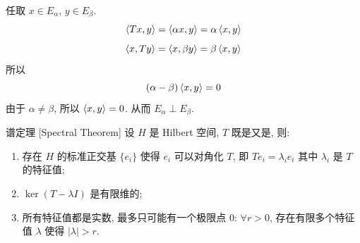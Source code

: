         \begin{prf}
            任取 \(x\in E_\alpha\), \(y\in E_\beta\).
            \[\expval{Tx, y}=\expval{\alpha x, y}=\alpha\expval{x,y}\]
            \[\expval{x, Ty}=\expval{x, \beta y}=\beta\expval{x,y}\]
            所以
            \[(\alpha-\beta)\expval{x, y}=0\]
            由于 \(\alpha\neq\beta\), 所以 \(\expval{x, y}=0\). 从而 \(E_\alpha\perp E_\beta\).
        \end{prf}

        \begin{thm}
            [spectral]
            {谱定理}
            [Spectral Theorem]
            设 $H$ 是 Hilbert 空间, $T$ 既是\SelfAdjOp{}又是\CompactOp{}, 则:
            \begin{enumerate}[label=(\roman*)]
                \item 存在 \(H\) 的标准正交基 \(\{e_i\}\) 使得 \(e_i\) 可以对角化 \(T\), 即 \(T e_i = \lambda_i e_i\) 其中 \(\lambda_i\) 是 \(T\) 的特征值;
                \item \Eigenspace{} \(\ker (T-\lambda I)\) 是有限维的;
                \item 所有特征值都是实数, 最多只可能有一个极限点 0: $\forall r>0$, 存在有限多个特征值 $\lambda$ 使得 $|\lambda| > r$.
            \end{enumerate}
        \end{thm}

